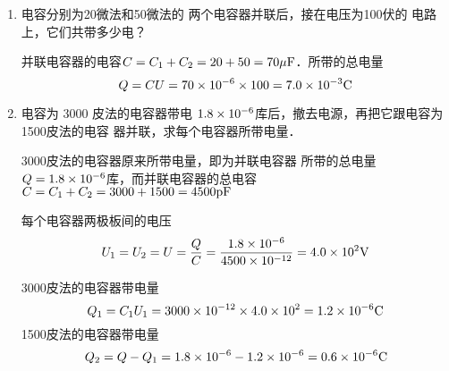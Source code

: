 \begin{enumerate}
\begin{figure}[htp]
    \caption{}
\end{figure}

\begin{proof}
    插入导体板后，相当于板间距离为$d_1$、$d_2$的两个平
    行板电容器串联．它们的电容分别为
    $C_1=\dfrac{S}{4\pi kd_1}$和 $C_2=\dfrac{S}{4\pi kd_2}$, 串联电容器的电容$C=\dfrac{C_1C_2}{C_1+C_2}$，将上式代入，得
    \[C=\frac{S}{4\pi k(d_1+d_2)}\]
    因为$d_1+d_2=\ell-d$, 所以$C=\dfrac{S}{4\pi k(\ell-d)}$.
\end{proof}

\item 电容分别为20微法和50微法的
两个电容器并联后，接在电压为100伏的
电路上，它们共带多少电？

\begin{solution}
    并联电容器的电容$C=C_1+C_2=20+50=
    70{\rm \mu F}$．所带的总电量
    \[Q=CU=70\times10^{-6}\times100=7.0\times  10^{-3}{\rm C}\]
\end{solution}

\item 电容为 3000 皮法的电容器带电
$1.8\times10^{-6}$库后，撤去电源，再把它跟电容为1500皮法的电容
器并联，求每个电容器所带电量．

\begin{solution}
    3000皮法的电容器原来所带电量，即为并联电容器
    所带的总电量$Q=1.8\times10^{-6}$库，而并联电容器的总电容$C=
    C_1+C_2=3000+1500=4500{\rm pF}$

    每个电容器两极板间的电压
    \[U_1=U_2=U=\frac{Q}{C}=\frac{1.8\times10^{-6}}{4500\times10^{-12}}=4.0\times 10^2{\rm V}\]
    
    3000皮法的电容器带电量
    \[Q_1=C_1U_1=3000\times10^{-12}\times4.0 \times10^2=1.2\times10^{-6}{\rm C}\]
    1500皮法的电容器带电量
    \[Q_2=Q-Q_1=1.8\times10^{-6}-1.2 \times10^{-6}=0.6\times10^{-6}{\rm C}\]
\end{solution}

\end{enumerate}





